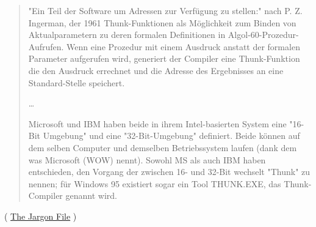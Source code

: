 \begin{framed}
\begin{quotation}
"Ein Teil der Software um Adressen zur Verfügung zu stellen:" nach P. Z. Ingerman,
der 1961 Thunk-Funktionen als Möglichkeit zum Binden von Aktualparametern zu deren
formalen Definitionen in Algol-60-Prozedur-Aufrufen. Wenn eine Prozedur mit einem Ausdruck anstatt
der formalen Parameter aufgerufen wird, generiert der Compiler eine Thunk-Funktion die den Ausdruck
errechnet und die Adresse des Ergebnisses an eine Standard-Stelle speichert.

\dots

Microsoft und IBM haben beide in ihrem Intel-basierten System eine "16-Bit Umgebung"
und eine "32-Bit-Umgebung" definiert. Beide können auf dem selben Computer und demselben
Betriebssystem laufen (dank dem was Microsoft  (WOW) nennt).
Sowohl MS als auch IBM haben entschieden, den Vorgang der zwischen 16- und 32-Bit wechselt
"Thunk" zu nennen; für Windows 95 existiert sogar ein Tool THUNK.EXE, das Thunk-Compiler
genannt wird.\end{quotation}
\end{framed}
( \href{http://www.catb.org/jargon/html/T/thunk.html}{The Jargon File} )
